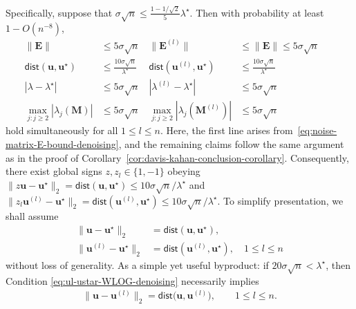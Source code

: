 Specifically, suppose that $\sigma\sqrt{n}\leq\frac{1-1/\sqrt{2}}{5}\lambda^{\star}$. Then with probability at least $1-O(n^{-8})$,
%
\begin{subequations}
\label{eq:L2-perturbation-summary-denoising}
%
\begin{align}
  \|\bm{E} \|  &\leq 5\sigma \sqrt{n}    & \|\bm{E}^{(l)} \| &\leq \|\bm{E} \| \leq 5\sigma \sqrt{n}  && \\
  \mathsf{dist}( \bm{u} , \bm{u}^{\star} )  &\leq \frac{10\sigma\sqrt{n}}{\lambda^{\star}}  ~~
 & \mathsf{dist}( \bm{u}^{(l)} , \bm{u}^{\star} )  &\leq \frac{10\sigma\sqrt{n}}{\lambda^{\star}} && \\
	| \lambda - \lambda^{\star} |  &\leq 5\sigma \sqrt{n} & | \lambda^{(l)} - \lambda^{\star} |  &\leq 5\sigma \sqrt{n} &&\\
	\max_{j: j\geq 2} | \lambda_j(\bm{M})   |  &\leq 5\sigma \sqrt{n} & \max_{j: j\geq 2}| \lambda_j(\bm{M}^{(l)}) |  &\leq 5\sigma \sqrt{n}
\end{align}
%
\end{subequations}
%
hold simultaneously for all $1\leq l\leq n$. Here, the first line arises from~\eqref{eq:noise-matrix-E-bound-denoising}, and the remaining claims follow the same argument as in the proof of Corollary~\ref{cor:davis-kahan-conclusion-corollary}. 
 Consequently, there exist global signs $z, z_l \in \{1,-1\}$  obeying $\|z\bm{u} - \bm{u}^{\star}\|_2= \mathsf{dist}( \bm{u}, \bm{u}^{\star} ) \leq 10\sigma\sqrt{n} / \lambda^{\star}$ and $\|z_l\bm{u}^{(l)} - \bm{u}^{\star}\|_2= \mathsf{dist}( \bm{u}^{(l)}, \bm{u}^{\star} ) \leq 10\sigma\sqrt{n} / \lambda^{\star}$. To simplify presentation, we shall assume
 \begin{subequations}
\label{eq:ul-ustar-WLOG-denoising}
\begin{align}
	\|\bm{u} - \bm{u}^{\star}\|_2 &= \mathsf{dist}( \bm{u}, \bm{u}^{\star} ), \quad \\
	\big\| \bm{u}^{(l)} - \bm{u}^{\star} \big\|_2 &= \mathsf{dist}( \bm{u}^{(l)}, \bm{u}^{\star} ) , \quad 1 \leq l \leq n
\end{align}
\end{subequations}
%
without loss of generality.
As a simple yet useful byproduct: if ${20\sigma{\sqrt{n}}} < \lambda^{\star}$, then Condition \eqref{eq:ul-ustar-WLOG-denoising} necessarily implies
%
\begin{align}
	\big\| \bm{u} -  \bm{u}^{(l)} \big\|_2 = \mathsf{dist}\big( \bm{u}, \bm{u}^{(l)}\big), \qquad 1 \leq l \leq n.  	
	\label{eq:u-ul-rotation-denoising}
\end{align}
